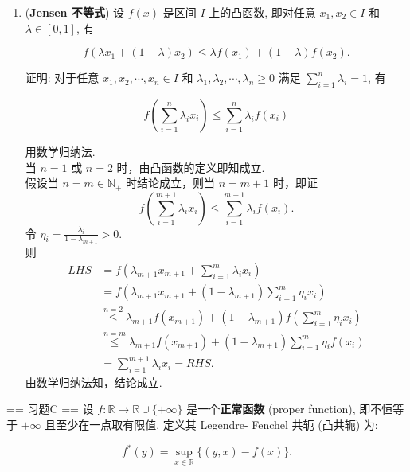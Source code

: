\begin{enumerate}
    \item[7.](\textbf{Jensen 不等式}) 设 \(f(x)\) 是区间 \(I\) 上的凸函数, 即对任意 \(\displaystyle x_1, x_2 \in I\) 和 \(\lambda \in [0,1]\), 有

\[\displaystyle f(\lambda x_1 + (1 - \lambda)x_2) \leq \lambda f(x_1) + (1 - \lambda)f(x_2).\]

    证明: 对于任意 \(\displaystyle x_1, x_2, \cdots , x_n \in I\) 和 \(\displaystyle\lambda_1, \lambda_2, \cdots , \lambda_n \geq 0\) 满足 \(\displaystyle\sum_{i=1}^{n} \lambda_i = 1\), 有

\[\displaystyle f\left(\sum_{i=1}^{n} \lambda_i x_i\right) \leq \sum_{i=1}^{n} \lambda_i f(x_i)\]
    \begin{solution}
        用数学归纳法.\\
        当 $n=1$ 或 $n=2$ 时，由凸函数的定义即知成立.\\
        假设当 $n=m\in\mathbb{N}_{+}$ 时结论成立，则当 $n=m+1$ 时，即证
        \[
        f\left(\sum_{i=1}^{m+1}\lambda_{i}x_{i}\right)\leq \sum_{i=1}^{m+1}\lambda_{i}f(x_{i}).
        \]
        令 $\displaystyle\eta_{i}=\frac{\lambda_{i}}{1-\lambda_{m+1}}>0$.\\
        则
        \[
        \begin{aligned}
        LHS&=f\left(\lambda_{m+1}x_{m+1}+\sum_{i=1}^{m}\lambda_{i}x_{i}\right)\\
        &=f\left(\lambda_{m+1}x_{m+1}+(1-\lambda_{m+1})\sum_{i=1}^{m}\eta_{i}x_{i}\right)\\
        &\overset{n=2}{\leq}\lambda_{m+1}f(x_{m+1})+(1-\lambda_{m+1})f\left(\sum_{i=1}^{m}\eta_{i}x_{i}\right)\\
        &\overset{n=m}{\leq}\lambda_{m+1}f(x_{m+1})+(1-\lambda_{m+1})\sum_{i=1}^{m}\eta_{i}f(x_i)\\
        &=\sum_{i=1}^{m+1}\lambda_{i}x_{i}=RHS.
        \end{aligned}
        \]
        由数学归纳法知，结论成立.
    \end{solution}
\end{enumerate} 

== 习题C ==
设 \(\displaystyle f: \mathbb{R} \to \mathbb{R} \cup \{+\infty \}\) 是一个\textbf{正常函数} (proper function), 
即不恒等于 \(+\infty\) 且至少在一点取有限值. 定义其 Legendre- Fenchel 共轭 (凸共轭) 为:

\[\displaystyle f^{*}(y) = \sup_{x \in \mathbb{R}} \{(y,x) - f(x)\}.\]

